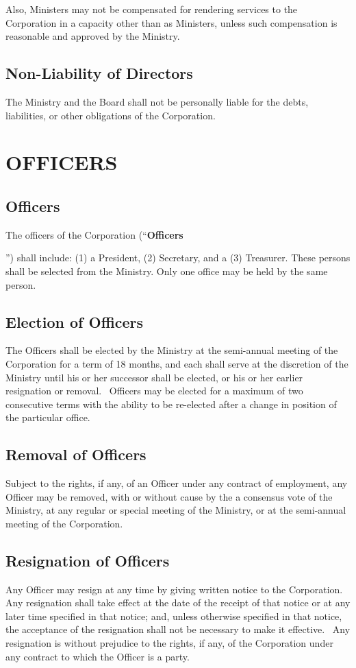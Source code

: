 \documentclass[letterpaper,titlepage]{article}
\newcommand{\defn}[1]{\refstepcounter{defn}\textbf{#1}\addcontentsline{defn}{defn}{\protect\numberline{\thedefn}#1}}
\begin{document}
Also, Ministers may not be compensated for rendering services to the Corporation in a capacity other than as Ministers, unless such compensation is reasonable and approved by the Ministry.
\subsection{Non-Liability of Directors}
\label{sec:nonliability}
The Ministry and the Board shall not be personally liable for the debts, liabilities, or other obligations of the Corporation.
\section{OFFICERS}
\label{sec:officers}
\subsection{Officers}
\label{sec:officers2}
The officers of the Corporation (``\defn{Officers}'') shall include: (1) a President, (2) Secretary, and a (3) Treasurer. These persons shall be selected from the Ministry. Only one office may be held by the same person.
\subsection{Election of Officers}
\label{sec:electionOfficers}
The Officers shall be elected by the Ministry at the semi-annual meeting of the Corporation for a term of 18 months, and each shall serve at the discretion of the Ministry until his or her successor shall be elected, or his or her earlier resignation or removal.  Officers may be elected for a maximum of two consecutive terms with the ability to be re-elected after a change in position of the particular office. 
\subsection{Removal of Officers}
\label{sec:removalOfficers}
Subject to the rights, if any, of an Officer under any contract of employment, any Officer may be removed, with or without cause by the a consensus vote of the  Ministry, at any regular or special meeting of the Ministry, or at the semi-annual meeting of the Corporation.
\subsection{Resignation of Officers}
\label{sec:resignationOfficers}
Any Officer may resign at any time by giving written notice to the Corporation.  Any resignation shall take effect at the date of the receipt of that notice or at any later time specified in that notice; and, unless otherwise specified in that notice, the acceptance of the resignation shall not be necessary to make it effective.  Any resignation is without prejudice to the rights, if any, of the Corporation under any contract to which the Officer is a party.
\end{document}
